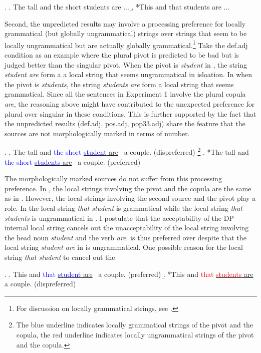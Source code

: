 \documentclass[
  11pt          %
  ,letterpaper  %
  ,center       %
  ,noupper      %
  ]{uconnthesis2}
\newcommand\blueuline[1]{\colorlet{temp}{.}\color{blue}\underline{\color{temp}#1}\color{temp}}
\newcommand\reduline[1]{\colorlet{temp}{.}\color{red}\underline{\color{temp}#1}\color{temp}}
\begin{document}
\ex. \a. The tall and the short students are ...
\b. *This and that students are ...

Second, the unpredicted results may involve a processing preference for locally grammatical (but globally ungrammatical) strings over strings that seem to be locally ungrammatical but are actually globally grammatical.\footnote{For discussion on locally grammatical strings, see \citealt{Tabor:2004}.} Take the def.adj condition as an example where the plural pivot is predicted to be bad but is judged better than the singular pivot. When the pivot is \textit{student} in \Next[a], the string \textit{student are} form a a local string that seems ungrammatical in isloation. In \Next[b] when the pivot is \textit{students}, the string \textit{students are} form a local string that seems grammatical. Since all the sentences in Experiment 1 involve the plural copula \textit{are}, the reasoning above might have contributed to the unexpected preference for plural over singular in these conditions. This is further supported by the fact that the unpredicted results (def.adj, pos.adj, pop33.adj) share the feature that the sources are not morphologically marked in terms of number. 

\ex. 
\a. The tall and \textcolor{blue}{the short} \reduline{\textcolor{blue}{student} are} ~a couple. (dispreferred) \footnote{The blue underline indicates locally grammatical strings of the pivot and the copula, the red underline indicates locally ungrammatical strings of the pivot and the copula. }
\b. *The tall and \textcolor{blue}{the short} \blueuline{\textcolor{blue}{students} are} ~a couple. (preferred)

The morphologically marked sources do not suffer from this processing preference. In \Next, the local strings involving the pivot and the copula are the same as in \Last. However, the local strings involving the second source and the pivot play a role. In \Next[a] the local string \textit{that student} is grammatical while the local string \textit{that students} is ungrammatical in \Next[b]. I postulate that the acceptability of the DP internal local string cancels out the unacceptability of the local string involving the head noun \textit{student} and the verb \textit{are}. \Next[a] is thus preferred over \Next[b] despite that the local string \textit{student are} in \Next[a] is ungrammatical. One possible reason for the local string \textit{that student} to cancel out the 

\ex.
\a.  This and \textcolor{blue}{that} \reduline{\textcolor{blue}{student} are}~ a couple. (preferred)
\b. *This and \textcolor{red}{that} \blueuline{\textcolor{red}{students} are}~ a couple. (dispreferred)
\end{document}
